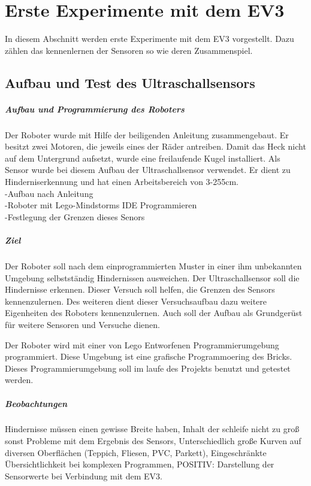 \chapter{Erste Experimente mit dem EV3}
In diesem Abschnitt werden erste Experimente mit dem EV3 vorgestellt. Dazu zählen das kennenlernen der Sensoren so wie deren Zusammenspiel. 
\section{Aufbau und Test des Ultraschallsensors}
\paragraph{Aufbau und Programmierung des Roboters}
Der Roboter wurde mit Hilfe der beiligenden Anleitung zusammengebaut. Er besitzt zwei Motoren, die jeweils eines der Räder antreiben. Damit das Heck nicht auf dem Untergrund aufsetzt, wurde eine freilaufende Kugel installiert. 
Als Sensor wurde bei diesem Aufbau der Ultraschallsensor verwendet. Er dient zu Hinderniserkennung und hat einen Arbeitsbereich von 3-255cm. \\
 
-Aufbau nach Anleitung\\
-Roboter mit Lego-Mindstorms IDE Programmieren \\
-Festlegung der Grenzen dieses Senors\\
\paragraph{Ziel}
Der Roboter soll nach dem einprogrammierten Muster in einer ihm unbekannten Umgebung selbstständig Hindernissen ausweichen. Der Ultraschallsensor soll die Hindernisse erkennen. Dieser Versuch soll helfen, die Grenzen des Sensors kennenzulernen. Des weiteren dient dieser Versuchsaufbau dazu weitere Eigenheiten des Roboters kennenzulernen. Auch soll der Aufbau als Grundgerüst für weitere Sensoren und Versuche dienen.  

Der Roboter wird mit einer von Lego Entworfenen Programmierumgebung programmiert. Diese Umgebung ist eine grafische Programmoering des Bricks. Dieses Programmierumgebung soll im laufe des Projekts benutzt und getestet werden. 
\paragraph{Beobachtungen}Hindernisse müssen einen gewisse Breite haben, Inhalt der schleife nicht zu groß sonst Probleme mit dem Ergebnis des Sensors, Unterschiedlich große Kurven auf diversen Oberflächen (Teppich, Fliesen, PVC, Parkett), Eingeschränkte Übersichtlichkeit bei komplexen Programmen,
POSITIV: Darstellung der Sensorwerte bei Verbindung mit dem EV3. \\
